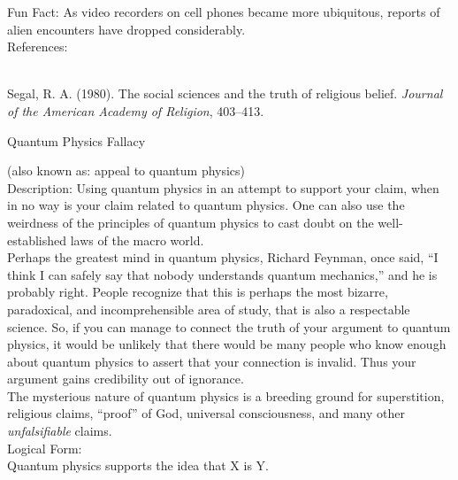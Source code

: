 \documentclass[a4paper,12pt,single,pdftex]{scrartcl}
\begin{document}
    
      Fun Fact: As video recorders on cell phones became more ubiquitous, reports of alien encounters have dropped considerably.
    \\

    References:

    
      
        
      \\

      
        
          Segal, R. A. (1980). The social sciences and the truth of religious belief. {\it Journal of the American Academy of Religion}, 403–413.
        
      
    
  

Quantum Physics Fallacy
    
      (also known as: appeal to quantum physics)
    \\

  
    
      
        Description: Using quantum physics in an attempt to support your claim, when in no way is your claim related to quantum physics.  One can also use the weirdness of the principles of quantum physics to cast doubt on the well-established laws of the macro world.
      \\

      
        Perhaps the greatest mind in quantum physics, Richard Feynman, once said, “I think I can safely say that nobody understands quantum mechanics,” and he is probably right.  People recognize that this is perhaps the most bizarre, paradoxical, and incomprehensible area of study, that is also a respectable science.  So, if you can manage to connect the truth of your argument to quantum physics, it would be unlikely that there would be many people who know enough about quantum physics to assert that your connection is invalid. Thus your argument gains credibility out of ignorance.
      \\

      
        The mysterious nature of quantum physics is a breeding ground for superstition, religious claims, “proof” of God, universal consciousness, and many other {\it unfalsifiable} claims. 
      \\

      
        Logical Form:
      \\

      
        Quantum physics supports the idea that X is Y.
      \\
\end{document}

